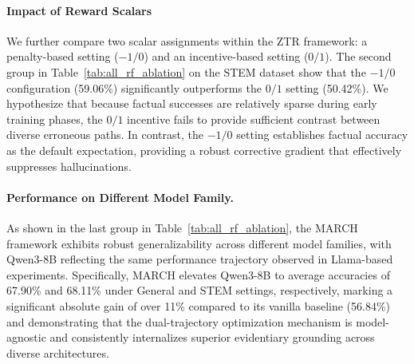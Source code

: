 \documentclass[10pt, a4paper, logo]{googledeepmind} %
\begin{document}
\paragraph{Impact of Reward Scalars}
We further compare two scalar assignments within the ZTR framework: a penalty-based setting ($-1/0$) and an incentive-based setting ($0/1$). The second group in Table~\ref{tab:all_rf_ablation} on the STEM dataset show that the $-1/0$ configuration (59.06\%) significantly outperforms the $0/1$ setting (50.42\%). We hypothesize that because factual successes are relatively sparse during early training phases, the $0/1$ incentive fails to provide sufficient contrast between diverse erroneous paths. In contrast, the $-1/0$ setting establishes factual accuracy as the default expectation, providing a robust corrective gradient that effectively suppresses hallucinations.


\paragraph{Performance on Different Model Family.} As shown in the last group in Table~\ref{tab:all_rf_ablation}, the MARCH framework exhibits robust generalizability across different model families, with Qwen3-8B reflecting the same performance trajectory observed in Llama-based experiments. Specifically, MARCH elevates Qwen3-8B to average accuracies of 67.90\% and 68.11\% under General and STEM settings, respectively, marking a significant absolute gain of over 11\% compared to its vanilla baseline (56.84\%) and demonstrating that the dual-trajectory optimization mechanism is model-agnostic and consistently internalizes superior evidentiary grounding across diverse architectures.
\end{document}
